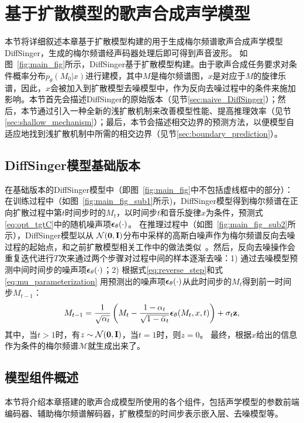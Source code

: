 \section{基于扩散模型的歌声合成声学模型}
本节将详细叙述本章基于扩散模型构建的用于生成梅尔频谱歌声合成声学模型DiffSinger，生成的梅尔频谱经声码器处理后即可得到声音波形。
如图~\ref{fig:main_fig}所示，DiffSinger基于扩散模型构建。由于歌声合成任务要求对条件概率分布$p_\theta(M_{0}|x)$进行建模，其中$M$是梅尔频谱图，$x$是对应于$M$的旋律乐谱，因此，$x$会被加入到扩散模型去噪模型中，作为反向去噪过程中的条件来施加影响。本节首先会描述DiffSinger的原始版本（见节\ref{sec:naive_DiffSinger}）；然后，本节通过引入一种全新的浅扩散机制来改善模型性能、提高推理效率（见节\ref{sec:shallow_mechanism}）；最后，本节会描述相交边界的预测方法，以便模型自适应地找到浅扩散机制中所需的相交边界（见节\ref{sec:boundary_prediction}）。
\subsection{DiffSinger模型基础版本}
\label{sec:naive_diffsinger}
在基础版本的DiffSinger模型中（即图~\ref{fig:main_fig}中不包括虚线框中的部分）：在训练过程中（如图~\ref{fig:main_fig_sub1}所示)，DiffSinger模型得到梅尔频谱在正向扩散过程中第$t$时间步时的$M_t$，以时间步$t$和音乐旋律$x$为条件，预测式\eqref{eq:opt_tgtC}中的随机噪声项${\boldsymbol{\epsilon}}_\theta(\cdot)$。 在推理过程中（如图~\ref{fig:main_fig_sub2}所示），DiffSinger模型以从
$\mathcal{N}(\mathbf{0}, \mathbf{I})$分布中采样的高斯白噪声作为梅尔频谱反向去噪过程的起始点，和之前扩散模型相关工作中的做法类似~\citep{Ho2020ddpm,kong2021diffwave}。然后，反向去噪操作会重复迭代进行$T$次来通过两个步骤对过程中间的样本逐渐去噪：1) 通过去噪模型预测中间时间步的噪声项${\boldsymbol{\epsilon}}_\theta(\cdot)$；2) 根据式\eqref{eq:reverse_step}和式\eqref{eq:mu_parameterization}
用预测出的噪声项${\boldsymbol{\epsilon}}_\theta(\cdot)$从此时间步的$M_t$得到前一时间步$M_{t-1}$：
\begin{equation}
    M_{t-1} = \frac{1}{\sqrt{\alpha_t}}\left( M_t - \frac{1-\alpha_t}{\sqrt{1-\bar\alpha_t}} {\boldsymbol{\epsilon}}_\theta(M_t, x, t) \right) + \sigma_t \mathbf{z},
\end{equation}
其中，当$t>1$时，有$z\sim\mathcal{N}(\mathbf{0}, \mathbf{I})$，当$t=1$时，则$z=0$。
最终，根据$x$给出的信息作为条件的梅尔频谱$\mathcal{M}$就生成出来了。
\subsection{模型组件概述}
本节将介绍本章搭建的歌声合成模型所使用的各个组件，包括声学模型的参数前端编码器、辅助梅尔频谱解码器，扩散模型的时间步表示嵌入层、去噪模型等。
